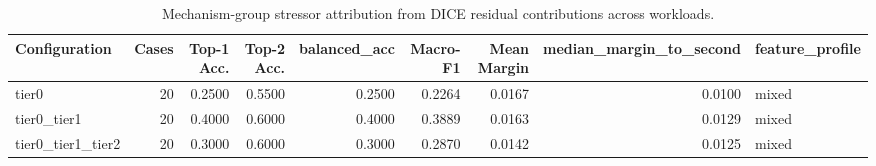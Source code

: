 \begin{table}[t]
\centering
\caption{Mechanism-group stressor attribution from DICE residual contributions across workloads.}
\label{tab:dice_stressor_diagnosis}
\footnotesize
\begin{tabular}{lrrrrrrrl}
\toprule
Configuration & Cases & Top-1 Acc. & Top-2 Acc. & balanced_acc & Macro-F1 & Mean Margin & median_margin_to_second & feature_profile \\
\midrule
tier0 & 20 & 0.2500 & 0.5500 & 0.2500 & 0.2264 & 0.0167 & 0.0100 & mixed \\
tier0_tier1 & 20 & 0.4000 & 0.6000 & 0.4000 & 0.3889 & 0.0163 & 0.0129 & mixed \\
tier0_tier1_tier2 & 20 & 0.3000 & 0.6000 & 0.3000 & 0.2870 & 0.0142 & 0.0125 & mixed \\
\bottomrule
\end{tabular}

\end{table}
